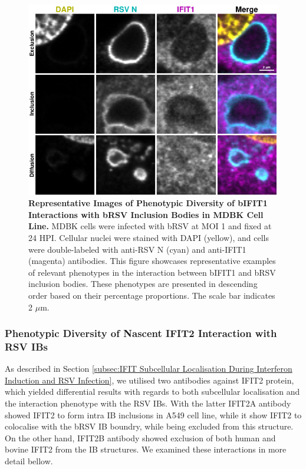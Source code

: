 \begin{figure}
    \centering
    \includegraphics[width=1\linewidth]{08. Chapter 3/Figs/02. Infection/01. IFIT1/09. mdbk i1.pdf}
    \caption[Representative Images of Phenotypic Diversity of bIFIT1 Interactions with bRSV Inclusion Bodies in MDBK Cell Line.]{\textbf{Representative Images of Phenotypic Diversity of bIFIT1 Interactions with bRSV Inclusion Bodies in MDBK Cell Line.} MDBK cells were infected with bRSV at MOI 1 and fixed at 24 HPI. Cellular nuclei were stained with DAPI (yellow), and cells were double-labeled with anti-RSV N (cyan) and anti-IFIT1 (magenta) antibodies. This figure showcases representative examples of relevant phenotypes in the interaction between bIFIT1 and bRSV inclusion bodies. These phenotypes are presented in descending order based on their percentage proportions. The scale bar indicates 2 \(\mu \mbox{m}\).}
    \label{fig:Representative Images of Phenotypic Diversity of bIFIT1 Interactions with bRSV Inclusion Bodies in MDBK Cell Line}
\end{figure}

\subsubsection{Phenotypic Diversity of Nascent IFIT2 Interaction with RSV IBs}
As described in Section \ref{subsec:IFIT Subcellular Localisation During Interferon Induction and RSV Infection}, we utilised two antibodies against IFIT2 protein, which yielded differential results with regards to both subcellular localisation and the interaction phenotype with the RSV IBs. With the latter IFIT2A antibody showed IFIT2 to form intra IB inclusions in A549 cell line, while it show IFIT2 to colocalise with the bRSV IB boundry, while being excluded from this structure. On the other hand, IFIT2B antibody showed exclusion of both human and bovine IFIT2 from the IB structures. We examined these interactions in more detail bellow.

